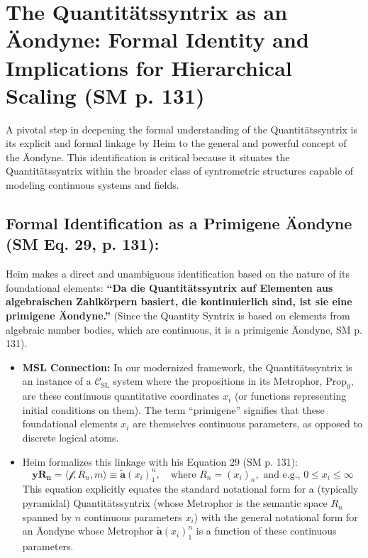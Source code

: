 \documentclass[
    12pt,              %
    a4paper,           %
    headings=normal,   %
    twoside=true,      %
    BCOR=8mm,          %
]{scrbook}
\newcommand{\q}[1]{\enquote{#1}}
\newcommand{\synkolationsstufe}{m}
\newcommand{\quantitaetssyntrix}{\bm{yR_n}}
\newcommand{\semantischermetrophor}{R_n}
\newcommand{\funktionaloperator}{\mathcal{f}}
\newcommand{\aeondynechaptereight}{\mathbf{\widetilde{a}}(x_i)^n_1}
\newcommand{\Propk}[1]{\text{Prop}_{#1}}
\begin{document}
\section{The Quantitätssyntrix as an Äondyne: Formal Identity and Implications for Hierarchical Scaling (SM p. 131)}
\label{sec:ch8_1_as_aeondyne}

A pivotal step in deepening the formal understanding of the Quantitätssyntrix is its explicit and formal linkage by Heim to the general and powerful concept of the Äondyne. This identification is critical because it situates the Quantitätssyntrix within the broader class of syntrometric structures capable of modeling continuous systems and fields.

\subsection{Formal Identification as a Primigene Äondyne (SM Eq. 29, p. 131):}
\label{sec:ch8_1_1_formal_id}
Heim makes a direct and unambiguous identification based on the nature of its foundational elements: \textbf{\q{Da die Quantitätssyntrix auf Elementen aus algebraischen Zahlkörpern basiert, die kontinuierlich sind, ist sie eine primigene Äondyne.}} (Since the Quantity Syntrix is based on elements from algebraic number bodies, which are continuous, it is a primigenic Äondyne, SM p. 131).
\begin{itemize}
    \item   \textbf{MSL Connection:} In our modernized framework, the Quantitätssyntrix is an instance of a \(\mathcal{C}_{\text{SL}}\) system where the propositions in its Metrophor, \(\Propk{0}\), are these continuous quantitative coordinates \(x_i\) (or functions representing initial conditions on them). The term \q{primigene} signifies that these foundational elements \(x_i\) are themselves continuous parameters, as opposed to discrete logical atoms.
    \item   Heim formalizes this linkage with his Equation 29 (SM p. 131):
        \begin{equation} \label{eq:original_quantitaetssyntrix_as_aeondyne} %
        \quantitaetssyntrix = \langle \funktionaloperator, \semantischermetrophor, \synkolationsstufe \rangle \equiv \aeondynechaptereight, \quad \text{where } \semantischermetrophor = (x_i)_n, \text{ and e.g., } 0 \le x_i \le \infty
        \end{equation}
        This equation explicitly equates the standard notational form for a (typically pyramidal) Quantitätssyntrix (whose Metrophor is the semantic space \(\semantischermetrophor\) spanned by \(n\) continuous parameters \(x_i\)) with the general notational form for an Äondyne whose Metrophor \(\aeondynechaptereight\) is a function of these continuous parameters.
\end{itemize}
\end{document}
